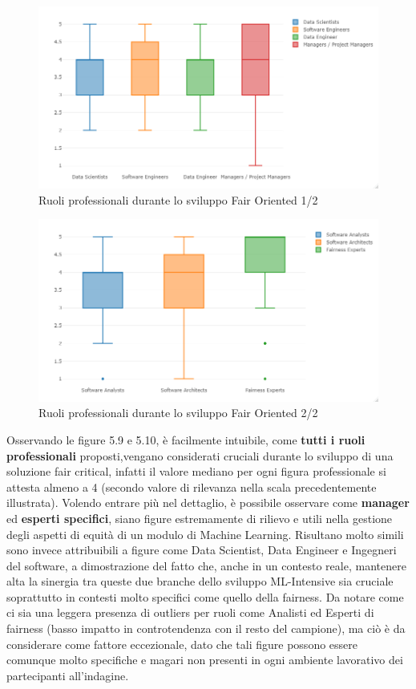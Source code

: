 	  \begin{figure}[h!]
        \centering
        \includegraphics[width=1\textwidth]{figure/Analisi/RQ2/RoleImpactBoxPlot1.png}
        \caption{Ruoli professionali durante lo sviluppo Fair Oriented 1/2}
    \end{figure}
    
     \begin{figure}[h!]
        \centering
        \includegraphics[width=1\textwidth]{figure/Analisi/RQ2/RoleImpactBoxPlot2.png}
        \caption{Ruoli professionali durante lo sviluppo Fair Oriented 2/2}
    \end{figure}
	 
	 
	 Osservando le figure 5.9 e 5.10, è facilmente intuibile, come \textbf{tutti i ruoli professionali} proposti,vengano considerati cruciali durante lo sviluppo di una soluzione fair critical, infatti il valore mediano per ogni figura professionale si attesta almeno a 4 (secondo valore di rilevanza nella scala precedentemente illustrata). Volendo entrare più nel dettaglio, è possibile osservare come \textbf{manager} ed \textbf{esperti specifici}, siano figure estremamente di rilievo e utili nella gestione degli aspetti di equità di un modulo di Machine Learning. Risultano molto simili sono invece attribuibili a figure come Data Scientist, Data Engineer e Ingegneri del software, a dimostrazione del fatto che, anche in un contesto reale, mantenere alta la sinergia tra queste due branche dello sviluppo ML-Intensive sia cruciale soprattutto in contesti molto specifici come quello della fairness. Da notare come ci sia una leggera presenza di outliers per ruoli come Analisti ed Esperti di fairness (basso impatto in controtendenza con il resto del campione), ma ciò è da considerare come fattore eccezionale, dato che tali figure possono essere comunque molto specifiche e magari non presenti in ogni ambiente lavorativo dei partecipanti all'indagine.
	 
